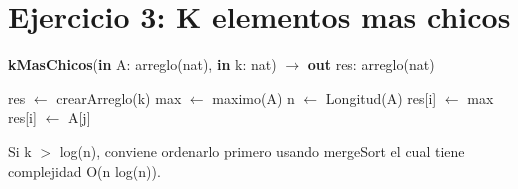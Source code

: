 \section{Ejercicio 3: K elementos mas chicos}

\begin{algorithm}[H]
\caption{
    \textbf{kMasChicos}(\textbf{in} A: arreglo(nat), \textbf{in} k: nat) $\to$ \textbf{out} res: arreglo(nat)
}
    \begin{algorithmic}[1]
        \State res $\gets$ crearArreglo(k)
        \State max $\gets$ maximo(A)
        \State n $\gets$ Longitud(A)
            \State res[i] $\gets$ max
        \EndFor
                    \State res[i] $\gets$ A[j]
                \EndIf
            \EndFor
        \EndFor
    \end{algorithmic}
\end{algorithm}

Si k $>$ log(n), conviene ordenarlo primero usando mergeSort el cual tiene complejidad O(n log(n)).